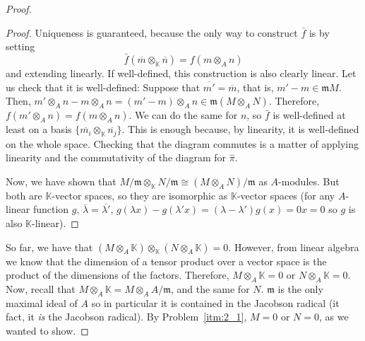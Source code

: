 \begin{problem}
\begin{enumerate}[label=(\theproblem.\arabic*),ref=\theproblem.\arabic*]
\begin{sol}
\begin{proof}
\begin{claim}
\begin{proof}
                                Uniqueness is guaranteed, because the only way to construct
                                $\bar{f}$ is by setting \[{\bar{f}(\overline{m} \otimes_{\mathbb{K}} \overline{n}) = f(m \otimes_A n)}\]
                                and extending linearly.
                                If well-defined, this construction is also clearly linear.
                                Let us check that it is well-defined:
                                Suppose that $\overline{m'} = \overline{m}$, that is, $m' - m \in \mathfrak{m}M$.
                                Then, $m' \otimes_A n - m \otimes_A n = (m' - m) \otimes_A n \in \mathfrak{m}(M \otimes_A N)$.
                                Therefore, $f(m' \otimes_A n) = f(m \otimes_A n)$.
                                We can do the same for $n$, so $\bar{f}$ is well-defined at least on a basis $\{\overline{m_i}\otimes_\mathbb{K}\overline{n_j}\}$.
                                This is enough because, by linearity, it is well-defined on the whole space.
                                Checking that the diagram commutes is a matter of applying linearity and the commutativity of the diagram for $\hat{\pi}$.


                                Now, we have shown that $M/\mathfrak{m} \otimes_\mathbb{K} N/\mathfrak{m} \cong (M \otimes_A N)/\mathfrak{m}$ as $A$-modules.
                                But both are $\mathbb{K}$-vector spaces, so they are isomorphic as $\mathbb{K}$-vector spaces (for any $A$-linear function $g$,
                                $\overline{\lambda} = \overline{\lambda'}$,
                                $g(\lambda x) - g(\lambda'x) = (\lambda - \lambda') g(x) = 0x = 0$ so $g$ is also $\mathbb{K}$-linear).
                            \end{proof}
                    \end{claim}

                    So far, we have that $ (M \otimes_A \mathbb{K}) \otimes_\mathbb{K}( N \otimes_A \mathbb{K}) = 0$.
                    However, from linear algebra we know that the dimension of a tensor product over a vector space
                    is the product of the dimensions of the factors.
                    Therefore, $M \otimes_A \mathbb{K} = 0$ or $N \otimes_A \mathbb{K} = 0$.
                    Now, recall that $M \otimes_A \mathbb{K} = M \otimes_A A/\mathfrak{m} $, and the same for $N$.
                    $\mathfrak{m}$ is the only maximal ideal of $A$ so in particular it is contained in the Jacobson radical (it fact, it \emph{is} the Jacobson radical).
                    By Problem~\ref{itm:2_1}, $M = 0$ or $N = 0$, as we wanted to show.




\end{proof}
\end{sol}
\end{enumerate}
\end{problem}
